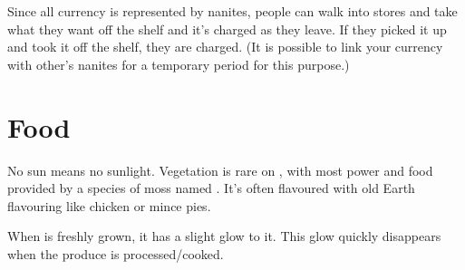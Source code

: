 \documentclass[a4paper,twocolumn]{memoir}
\begin{document}
Since all currency is represented by nanites, people can walk into stores and
take what they want off the shelf and it's charged as they leave. If they picked
it up and took it off the shelf, they are charged. (It is possible to link your
currency with other's nanites for a temporary period for this purpose.)

\section{Food}
\label{sec:food}

No sun means no sunlight. Vegetation is rare on \jhop, with most power and food
provided by a species of moss named \source. It's often flavoured with old Earth
flavouring like chicken or mince pies.

When \source is freshly grown, it has a slight glow to it. This glow quickly
disappears when the produce is processed/cooked.
\end{document}

